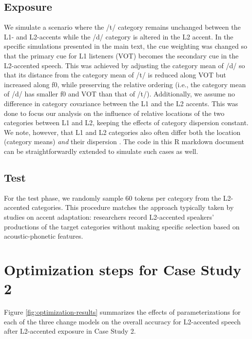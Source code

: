 \documentclass[
  11pt,
  man,floatsintext]{apa6}
\begin{document}
\hypertarget{exposure-1}{%
\subsection{Exposure}\label{exposure-1}}

We simulate a scenario where the /t/ category remains unchanged between the L1- and L2-accents while the /d/ category is altered in the L2 accent. In the specific simulations presented in the main text, the cue weighting was changed so that the primary cue for L1 listeners (VOT) becomes the secondary cue in the L2-accented speech. This was achieved by adjusting the category mean of /d/ so that its distance from the category mean of /t/ is reduced along VOT but increased along f0, while preserving the relative ordering (i.e., the category mean of /d/ has smaller f0 and VOT than that of /t/). Additionally, we assume no difference in category covariance between the L1 and the L2 accents. This was done to focus our analysis on the influence of relative locations of the two categories between L1 and L2, keeping the effects of category dispersion constant. We note, however, that L1 and L2 categories also often differ both the location (category means) \emph{and} their dispersion \autocites[category variance-covariance, e.g.,][]{schertz2015,xie-jaeger2020}. The code in this R markdown document can be straightforwardly extended to simulate such cases as well.

\hypertarget{test-1}{%
\subsection{Test}\label{test-1}}

For the test phase, we randomly sample 60 tokens per category from the L2-accented categories. This procedure matches the approach typically taken by studies on accent adaptation: researchers record L2-accented speakers' productions of the target categories without making specific selection based on acoustic-phonetic features.

\hypertarget{optimization-steps-for-case-study-2}{%
\section{Optimization steps for Case Study 2}\label{optimization-steps-for-case-study-2}}

Figure \ref{fig:optimization-results} summarizes the effects of parameterizations for each of the three change models on the overall accuracy for L2-accented speech after L2-accented exposure in Case Study 2.
\end{document}
